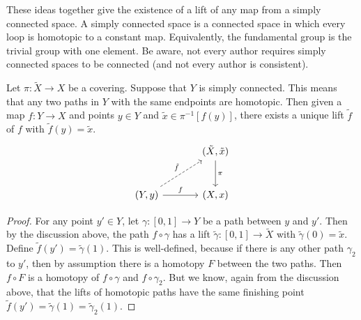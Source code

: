 These ideas together give the existence of a lift of any map from a simply connected space.
A simply connected space is a connected space in which every loop is homotopic to a constant map.
Equivalently, the fundamental group is the trivial group with one element.
Be aware, not every author requires simply connected spaces to be connected (and not every author is consistent).
\begin{corollary}
\textup{\cite[Prop~1.33]{Hatcher2002}}
\label{cor:lift existence}
Let $\pi : \tilde{X} \to X$ be a covering.
Suppose that $Y$ is simply connected.
This means that any two paths in $Y$ with the same endpoints are homotopic.
Then given a map $f : Y \to X$ and points $y \in Y$ and $\tilde{x} \in \pi^{-1}[f(y)]$, there exists a unique lift $\tilde{f}$ of $f$ with $\tilde{f}(y) = \tilde{x}$.
\[\begin{tikzcd}[sep=large]
& (\tilde{X},\tilde{x}) \arrow{d}{\pi} \\
(Y,y) \arrow{r}{f} \arrow[dashed]{ru}{\tilde{f}} & (X,x)
\end{tikzcd}\]
\end{corollary}
\begin{proof}
For any point $y' \in Y$, let $\gamma : [0,1] \to Y$ be a path between $y$ and $y'$.
Then by the discussion above, the path $f \circ \gamma$ has a lift $\tilde{\gamma} : [0,1] \to \tilde{X}$ with $\tilde{\gamma}(0) = \tilde{x}$.
Define $\tilde{f}(y') = \tilde{\gamma}(1)$.
This is well-defined, because if there is any other path $\gamma_2$ to $y'$, then by assumption there is a homotopy $F$ between the two paths.
Then $f\circ F$ is a homotopy of $f\circ\gamma$ and $f\circ\gamma_2$.
But we know, again from the discussion above, that the lifts of homotopic paths have the same finishing point $\tilde{f}(y') = \tilde{\gamma}(1) = \tilde{\gamma}_2(1)$.
\end{proof}

